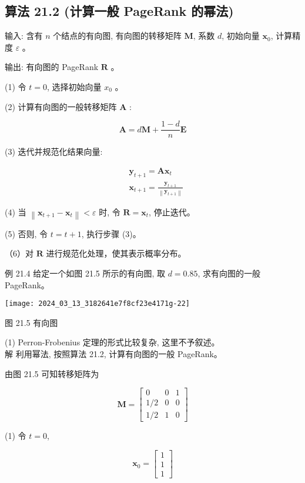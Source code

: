 \documentclass[10pt]{article}
\begin{document}
\begin{CJK*}{UTF8}{bsmi}
\section*{算法 21.2 (计算一般 PageRank 的幂法)}
输入: 含有 $n$ 个结点的有向图, 有向图的转移矩阵 $\boldsymbol{M}$, 系数 $d$, 初始向量 $\boldsymbol{x}_{0}$, 计算精度 $\varepsilon$ 。

输出: 有向图的 PageRank $\boldsymbol{R}$ 。

(1) 令 $t=0$, 选择初始向量 $x_{0}$ 。

(2) 计算有向图的一般转移矩阵 $\boldsymbol{A}$ :

$$
\boldsymbol{A}=d \boldsymbol{M}+\frac{1-d}{n} \boldsymbol{E}
$$

(3) 迭代并规范化结果向量:

$$
\begin{aligned}
& \boldsymbol{y}_{t+1}=\boldsymbol{A} \boldsymbol{x}_{t} \\
& \boldsymbol{x}_{t+1}=\frac{\boldsymbol{y}_{t+1}}{\left\|\boldsymbol{y}_{t+1}\right\|}
\end{aligned}
$$

(4) 当 $\left\|\boldsymbol{x}_{t+1}-\boldsymbol{x}_{t}\right\|<\varepsilon$ 时, 令 $\boldsymbol{R}=\boldsymbol{x}_{t}$, 停止迭代。

(5) 否则, 令 $t=t+1$, 执行步骤 (3)。

（6）对 $\boldsymbol{R}$ 进行规范化处理，使其表示概率分布。

例 21.4 给定一个如图 21.5 所示的有向图, 取 $d=0.85$, 求有向图的一般 PageRank。

\begin{center}
\texttt{[image: 2024\_03\_13\_3182641e7f8cf23e4171g-22]}
\end{center}

图 21.5 有向图

(1) Perron-Frobenius 定理的形式比较复杂, 这里不予叙述。\\
解 利用幂法, 按照算法 21.2, 计算有向图的一般 PageRank。

由图 21.5 可知转移矩阵为

$$
\boldsymbol{M}=\left[\begin{array}{ccc}
0 & 0 & 1 \\
1 / 2 & 0 & 0 \\
1 / 2 & 1 & 0
\end{array}\right]
$$

(1) 令 $t=0$,

$$
\boldsymbol{x}_{0}=\left[\begin{array}{l}
1 \\
1 \\
1
\end{array}\right]
$$


\end{CJK*}
\end{document}
